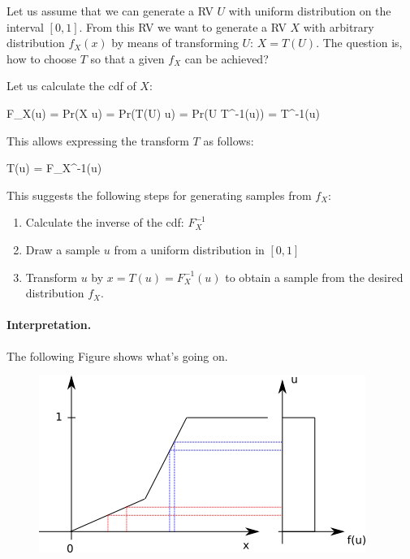 
Let us assume that we can generate a RV $U$ with uniform distribution on the interval $[0,1]$. From this RV we want to generate a RV $X$ with arbitrary distribution $f_X(x)$ by means of transforming $U$: $X = T(U)$. The question is, how to choose $T$ so that a given $f_X$ can be achieved?

Let us calculate the cdf of $X$:

\bee
F_X(u) = Pr(X \leq u) = Pr(T(U) \leq u) = Pr(U \leq T^{-1}(u)) = T^{-1}(u)
\eee

This allows expressing the transform $T$ as follows:

\bee
T(u) = F_X^{-1}(u)
\eee

This suggests the following steps for generating samples from $f_X$:

\begin{enumerate}

  \item Calculate the inverse of the cdf: $F_X^{-1}$

  \item Draw a sample $u$ from a uniform distribution in $[0,1]$

  \item Transform $u$ by $x = T(u) = F_X^{-1}(u)$ to obtain a sample from the desired distribution $f_X$.

\end{enumerate}

\paragraph{Interpretation.} The following Figure shows what's going on.

\begin{figure}[H]
	\includegraphics[scale=1.0]{images/generating_rvs.png}
\end{figure}


